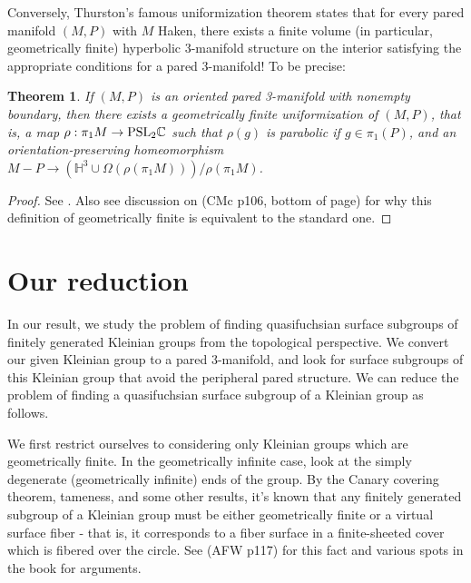 \documentclass[12pt]{amsart}
\newtheorem{thm}[theorem]{Theorem}
\theoremstyle{definition}
\theoremstyle{remark}
\newcommand{\Om}{\Omega}
\begin{document}
Conversely, Thurston's famous uniformization theorem states that for every
pared manifold $(M,P)$ with $M$ Haken, there exists a finite volume (in
particular, geometrically finite) hyperbolic 3-manifold structure on the
interior satisfying the appropriate conditions for a pared 3-manifold! To be
precise:



\begin{thm}

If $(M,P)$ is an oriented pared 3-manifold with nonempty boundary, then
there exists a geometrically finite uniformization of $(M,P)$, that is, a map
$\rho: \pi_1M \to \mbox{\rm{PSL}}_2\mathbb{C}$ such that $\rho(g)$ is parabolic
if $g \in \pi_1(P)$, and an orientation-preserving homeomorphism $M-P \to
\left(\mathbb{H}^3 \cup \Om(\rho(\pi_1M))\right)/\rho(\pi_1M)$.

\end{thm}
\begin{proof}

See \cite{CMc}.
Also see discussion on (CMc p106, bottom of page) for why this definition of
geometrically finite is equivalent to the standard one.

\end{proof}


\section{Our reduction}

In our result, we study the problem of finding quasifuchsian surface subgroups
of finitely generated Kleinian groups from the topological perspective. We
convert our given Kleinian group to a pared 3-manifold, and look for surface
subgroups of this Kleinian group that avoid the peripheral pared structure. We
can reduce the problem of finding a quasifuchsian surface subgroup of
a Kleinian group as follows.

We first restrict ourselves to considering only Kleinian groups which are
geometrically finite. In the geometrically infinite case, look at the simply
degenerate (geometrically infinite) ends of the group. By the Canary covering
theorem, tameness, and some other results, it's known that any finitely
generated subgroup of a Kleinian group must be either geometrically finite or
a virtual surface fiber - that is, it corresponds to a fiber surface in
a finite-sheeted cover which is fibered over the circle. See (AFW p117) for
this fact and various spots in the book for arguments.
\end{document}

